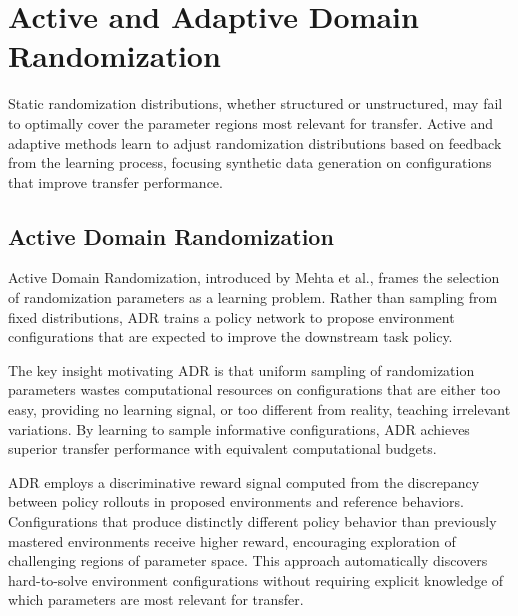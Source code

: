 \section{Active and Adaptive Domain Randomization}
\label{sec:active_dr}

Static randomization distributions, whether structured or unstructured, may fail to optimally cover the parameter regions most relevant for transfer. Active and adaptive methods learn to adjust randomization distributions based on feedback from the learning process, focusing synthetic data generation on configurations that improve transfer performance.

\subsection{Active Domain Randomization}

Active Domain Randomization, introduced by Mehta et al., frames the selection of randomization parameters as a learning problem. Rather than sampling from fixed distributions, ADR trains a policy network to propose environment configurations that are expected to improve the downstream task policy.

The key insight motivating ADR is that uniform sampling of randomization parameters wastes computational resources on configurations that are either too easy, providing no learning signal, or too different from reality, teaching irrelevant variations. By learning to sample informative configurations, ADR achieves superior transfer performance with equivalent computational budgets.

ADR employs a discriminative reward signal computed from the discrepancy between policy rollouts in proposed environments and reference behaviors. Configurations that produce distinctly different policy behavior than previously mastered environments receive higher reward, encouraging exploration of challenging regions of parameter space. This approach automatically discovers hard-to-solve environment configurations without requiring explicit knowledge of which parameters are most relevant for transfer.

